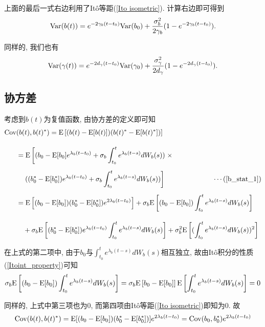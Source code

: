 \documentclass[notitlepage,cs4size,punct,oneside]{ctexrep}
\numberwithin{equation}{section}
\theoremstyle{mystyle}
\begin{document}
上面的最后一式右边利用了It\^{o}等距(\ref{Ito isometric}).
计算右边即可得到
\begin{equation} \label{b_stat_2} 
\text{Var}(b(t)) = e^{-2\gamma_b(t-t_0)}\text{Var}(b_0) + \frac{\sigma_b^2}{2\gamma_b}(1-e^{-2\gamma_b(t-t_0)}).
\end{equation}

同样的, 我们也有
\begin{equation} \label{gamma_stat_2}
\text{Var}(\gamma(t)) = e^{-2d_\gamma(t-t_0)}\text{Var}(\gamma_0) + \frac{\sigma_\gamma^2}{2d_\gamma}(1-e^{-2d_\gamma(t-t_0)}).
\end{equation}

\subsection{协方差}
考虑到$b(t)$为复值函数, 由协方差的定义\cite{shuyuanhe2006probability}即可知
\[
\begin{split}
\text{Cov}&(b(t), b(t)^*) = \text{E}\left[(b(t) - \text{E}[b(t)])(b(t)^* - \text{E}[b(t)^*])\right] \\[10pt]
&= \text{E}\left[(b_0 - \text{E}[b_0]e^{\lambda_b (t-t_0)}+\sigma_b\int_{t_0}^{t} e^{\lambda_b (t-s)}dW_b(s))\right. \times \\[5pt]
&\quad \left.((b_0^* - \text{E}[b_0^*])e^{\lambda_b(t-t_0)}+\sigma_b\int_{t_0}^t e^{\lambda_b (t-s)}dW_b(s))\right] \quad\quad\quad\quad\quad\quad\quad\cdots(\ref{b_stat_1}) \\[5pt]
&= \text{E}\left[(b_0 - \text{E}[b_0])(b_0^* - \text{E}[b_0^*])e^{2\lambda_b (t-t_0)}\right] + \sigma_b\text{E}\left[(b_0 - \text{E}[b_0])\int_{t_0}^{t}e^{\lambda_b(t-s)}dW_b(s)\right]\\[10pt]
&\quad+ \sigma_b\text{E}\left[(b_0^*-\text{E}[b_0^*])e^{\lambda_b(t-t_0)}\int_{t_0}^{t}e^{\lambda_b(t-s)}dW_b(s)\right] + \sigma_b^2\text{E}\left[(\int_{t_0}^{t}e^{\lambda_b(t-s)}dW_b(s))^2\right]
\end{split}
\]

在上式的第二项中, 由于$b_0$与$\int_{t_0}^{t} e^{\lambda_b (t-s)}dW_b(s)$相互独立, 故由It\^{o}积分的性质(\ref{Itoint_property})可知
\[
\sigma_b\text{E}\left[(b_0 - \text{E}[b_0])\int_{t_0}^{t}e^{\lambda_b(t-s)}dW_b(s)\right] = \sigma_b\text{E}\left[b_0 - \text{E}[b_0]\right]\text{E}\left[\int_{t_0}^{t}e^{\lambda_b(t-s)}dW_b(s)\right] = 0
\]

同样的, 上式中第三项也为0, 而第四项由It\^{o}等距(\ref{Ito isometric})即知为0. 故
\begin{equation} \label{b_b*_Cov}
\text{Cov}(b(t), b(t)^*) = \text{E}[(b_0-\text{E}[b_0])(b_0^*-\text{E}[b_0^*])]e^{2\lambda_b(t-t_0)} = \text{Cov}(b_0, b_0^*)e^{2\lambda_b(t-t_0)}
\end{equation}
\end{document}
